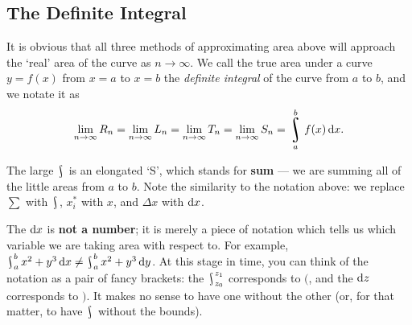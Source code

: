 \subsection*{The Definite Integral}
It is obvious that all three methods of approximating area above will approach the `real' area of the curve as $ n \to \infty $. We
call the true area under a curve $ y = f(x) $ from $ x = a $ to $ x = b $ the \textit{definite integral} of the curve from $ a $ to $ b $,
and we notate it as
\begin{displaymath}
  \lim_{n \to \infty} R_n = \lim_{n \to \infty} L_n = \lim_{n \to \infty} T_n = \lim_{n \to \infty} S_n = \rint^b_a f(x) \dif{x}.
\end{displaymath}

The large $ \rint $ is an elongated `S', which stands for \textbf{sum} --- we are summing all of the little areas from $ a $ to $ b $.
Note the similarity to the notation above: we replace $ \sum $ with $ \rint $, $ x_i^\ast $ with $ x $, and $ \Delta x $ with $ \dif{x} $.

The $ \dif{x} $ is \textbf{not a number}; it is merely a piece of notation which tells us which variable we are taking area with respect to.
For example, $ \rint^b_a x^2 + y^3 \dif{x} \neq \rint^b_a x^2 + y^3 \dif{y} $. At this stage in time, you can think of the notation as a
pair of fancy brackets: the $ \rint^{z_1}_{z_0} $ corresponds to $ \big( $, and the $ \dif{z} $ corresponds to $ \big) $. It makes no
sense to have one without the other (or, for that matter, to have $ \rint $ without the bounds).

\clearpage
